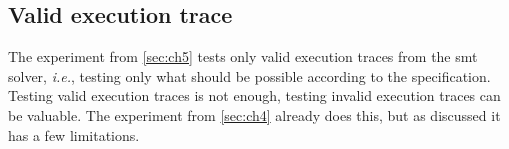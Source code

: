 \subsection*{Valid execution trace}
The experiment from \autoref{sec:ch5} tests only valid execution traces from
the \gls{smt} solver, \textit{i.e.}, testing only what should be possible according to
the specification. Testing valid execution traces is not enough, testing
invalid execution traces can be valuable. The experiment from
\autoref{sec:ch4} already does this, but as discussed it has a few limitations.
